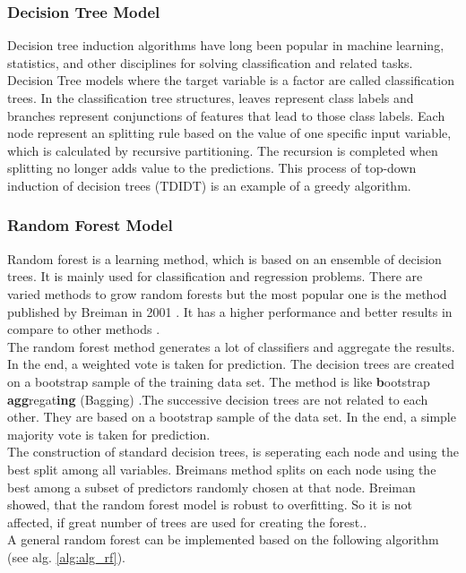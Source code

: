     	\subsubsection{Decision Tree Model}
            \noindent Decision tree induction algorithms have long been popular in machine learning, statistics, and other disciplines for solving classification and related tasks. Decision Tree models where the target variable is a factor are called classification trees. In the classification tree structures, leaves represent class labels and branches represent conjunctions of features that lead to those class labels. Each node represent an splitting rule based on the value of one specific input variable, which is calculated by recursive partitioning. The recursion is completed when splitting no longer adds value to the predictions. This process of top-down induction of decision trees (TDIDT) \citep{quinlan} is an example of a greedy algorithm.
    	\subsubsection{Random Forest Model}
    	\noindent Random forest is a learning method, which is based on an ensemble of decision trees. It is mainly used for classification and regression problems. There are varied methods to grow random forests but the most popular one is the method published by Breiman in 2001 \cite{Breiman2001}. It has a higher performance and better results in compare to other methods \cite{4016560}. \\
    	 [\baselineskip]\indent The random forest method generates a lot of classifiers and aggregate the results. In the end, a weighted vote is taken for prediction. The decision trees are created on a bootstrap sample of the training data set. The method is like \textbf{b}ootstrap \textbf{agg}regat\textbf{ing} (Bagging) \cite{Breiman96}.The successive decision trees are not related to each other. They are based on a bootstrap sample of the data set. In the end, a simple majority vote is taken for prediction.\\
    	  [\baselineskip]\indent The construction of standard decision trees, is seperating each node and using the best split among all variables. Breimans method splits on each node using the best among a subset of predictors randomly chosen at that node. Breiman showed, that the random forest model is robust to overfitting. So it is not affected, if great number of trees are used for creating the forest.\cite{Breiman2001}.\\
    	   [\baselineskip]\indent A general random forest can be implemented based on the following algorithm (see alg. \ref{alg:alg_rf}).\\

